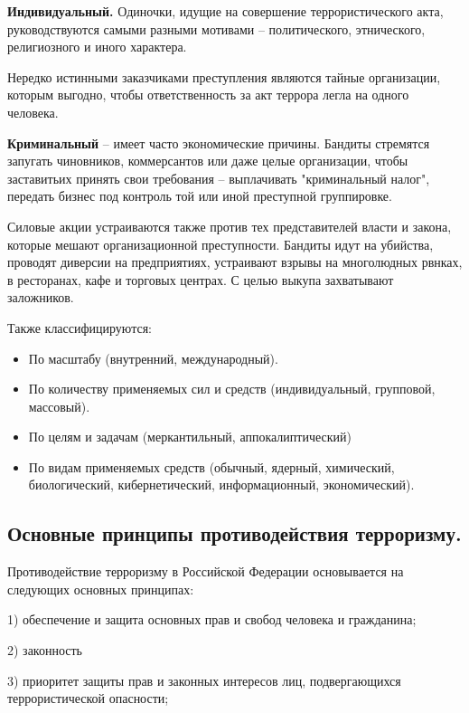 \documentclass[a4paper, 12pt]{article}
\theoremstyle{definition}
\begin{document}
        \textbf{Индивидуальный.} Одиночки, идущие на совершение террористического акта, руководствуются самыми разными мотивами -- политического, этнического, религиозного и иного характера.
        
        Нередко истинными заказчиками преступления являются тайные организации, которым выгодно, чтобы ответственность за акт террора легла на одного человека.

        \textbf{Криминальный} -- имеет часто экономические причины. Бандиты стремятся запугать чиновников, коммерсантов или даже целые организации, чтобы заставитьих принять свои требования -- выплачивать "криминальный налог", передать бизнес под контроль той или иной преступной группировке.

        Силовые акции устраиваются также против тех представителей власти и закона, которые мешают организационной преступности. Бандиты идут на убийства, проводят диверсии на предприятиях, устраивают взрывы на многолюдных рвнках, в ресторанах, кафе и торговых центрах. С целью выкупа захватывают заложников.

        Также классифицируются:
        \begin{itemize}
            \item По масштабу (внутренний, международный).
            \item По количеству применяемых сил и средств (индивидуальный, групповой, массовый).
            \item По целям и задачам (меркантильный, аппокалиптический)
            \item По видам применяемых средств (обычный, ядерный, химический, биологический, кибернетический, информационный, экономический).
        \end{itemize}
        
        \subsection{Основные принципы противодействия терроризму.}

        Противодействие терроризму в Российской Федерации основывается на следующих основных принципах:

        1) обеспечение и защита основных прав и свобод человека и гражданина;

        2) законность

        3) приоритет защиты прав и законных интересов лиц, подвергающихся террористической опасности;
\end{document}

